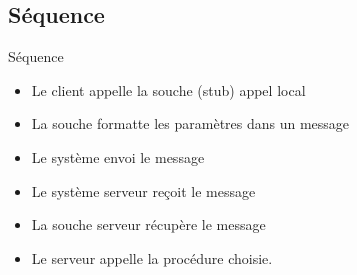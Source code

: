 \begin{frame}{\sectitle}
    \def\subsectitle{Séquence}
    \subsection{\subsectitle}
    \begin{block}{\subsectitle}
        \begin{itemize}
            \item Le client appelle la souche (stub) appel local
            \item La souche formatte les paramètres dans un message
            \item Le système envoi le message
            \item Le système serveur reçoit le message
            \item La souche serveur récupère le message
            \item Le serveur appelle la procédure choisie.
        \end{itemize}
    \end{block}
\end{frame}

\def\sectitle{Stratégie d'exécution}
